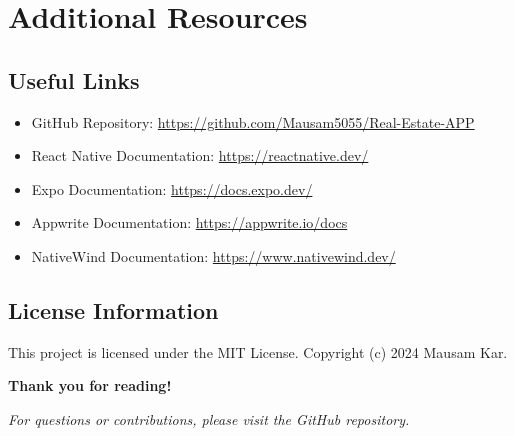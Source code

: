 \documentclass[11pt,a4paper,oneside]{book}
\begin{document}
\chapter{Additional Resources}

\section{Useful Links}

\begin{itemize}
    \item GitHub Repository: \url{https://github.com/Mausam5055/Real-Estate-APP}
    \item React Native Documentation: \url{https://reactnative.dev/}
    \item Expo Documentation: \url{https://docs.expo.dev/}
    \item Appwrite Documentation: \url{https://appwrite.io/docs}
    \item NativeWind Documentation: \url{https://www.nativewind.dev/}
\end{itemize}

\section{License Information}

This project is licensed under the MIT License. Copyright (c) 2024 Mausam Kar.

\vspace{1cm}

\begin{center}
\Large\textbf{Thank you for reading!}

\vspace{0.5cm}

\textit{For questions or contributions, please visit the GitHub repository.}
\end{center}
\end{document}
